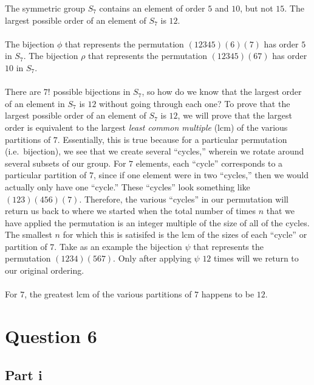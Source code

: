 \documentclass[letterpaper]{article}
\begin{document}
The symmetric group $ S_7 $ contains an element of order $ 5 $ and $ 10 $, but not $ 15 $.
The largest possible order of an element of $ S_7 $ is $ 12 $.
\\ \\
The bijection $ \phi $ that represents the permutation $ (1 2 3 4 5)(6)(7) $ has order $ 5 $ in $ S_7 $.
The bijection $ \rho $ that represents the permutation $ (1 2 3 4 5)(6 7) $ has order $ 10 $ in $ S_7 $.
\\ \\
There are $ 7! $ possible bijections in $ S_7 $, so how do we know that the largest order of an element in $ S_7 $ is $ 12 $ without going through each one?
To prove that the largest possible order of an element of $ S_7 $ is $ 12 $, we will prove that the largest order is equivalent to the largest \textit{least common multiple} (lcm) of the various partitions of $ 7 $.
Essentially, this is true because for a particular permutation (i.e.\ bijection), we see that we create several ``cycles,'' wherein we rotate around several subsets of our group.
For $ 7 $ elements, each ``cycle'' corresponds to a particular partition of $ 7 $, since if one element were in two ``cycles,'' then we would actually only have one ``cycle.''
These ``cycles'' look something like $ (1 2 3)(4 5 6)(7) $.
Therefore, the various ``cycles'' in our permutation will return us back to where we started when the total number of times $ n $ that we have applied the permutation is an integer multiple of the size of all of the cycles.
The smallest $ n $ for which this is satisifed is the lcm of the sizes of each ``cycle'' or partition of $ 7 $.
Take as an example the bijection $ \psi $ that represents the permutation $ (1 2 3 4)(5 6 7) $.
Only after applying $ \psi $ $ 12 $ times will we return to our original ordering.
\\ \\
For $ 7 $, the greatest lcm of the various partitions of $ 7 $ happens to be $ 12 $.

\section{Question 6}
\label{sec:Question6}

\subsection{Part i}
\label{subsec:6Parti}

\vspace{40 mm}
\end{document}
